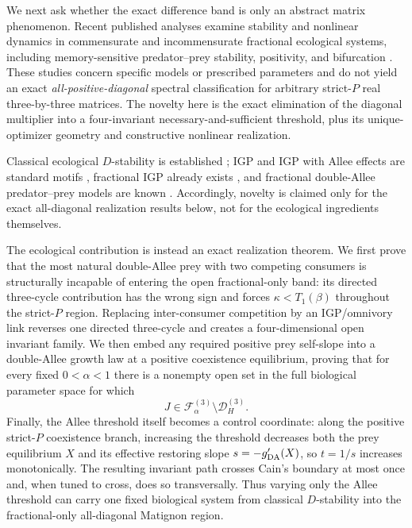 We next ask whether the exact difference band is only an abstract matrix phenomenon. Recent published analyses examine stability and nonlinear dynamics in commensurate and incommensurate fractional ecological systems, including memory-sensitive predator--prey stability, positivity, and bifurcation \cite{LiuLiHuang2025,AlomariBahaa2026,Baghel2026,Saha2026}. These studies concern specific models or prescribed parameters and do not yield an exact \emph{all-positive-diagonal} spectral classification for arbitrary strict-\(P\) real three-by-three matrices. The novelty here is the exact elimination of the diagonal multiplier into a four-invariant necessary-and-sufficient threshold, plus its unique-optimizer geometry and constructive nonlinear realization.

Classical ecological \(D\)-stability is established \cite{HouBaigent2015,ChenWangLiu2024}; IGP and IGP with Allee effects are standard motifs \cite{HoltPolis1997,BaiKangRuanWang2021}, fractional IGP already exists \cite{Panja2019}, and fractional double-Allee predator--prey models are known \cite{FractalFract2026DoubleAllee,Mondal2025}. Accordingly, novelty is claimed only for the exact all-diagonal realization results below, not for the ecological ingredients themselves.

The ecological contribution is instead an exact realization theorem. We first prove that the most natural double-Allee prey with two competing consumers is structurally incapable of entering the open fractional-only band: its directed three-cycle contribution has the wrong sign and forces \(\kappa<T_1(\beta)\) throughout the strict-\(P\) region. Replacing inter-consumer competition by an IGP/omnivory link reverses one directed three-cycle and creates a four-dimensional open invariant family. We then embed any required positive prey self-slope into a double-Allee growth law at a positive coexistence equilibrium, proving that for every fixed \(0<\alpha<1\) there is a nonempty open set in the full biological parameter space for which
\[
 J\in\mathcal F_\alpha^{(3)}
 \setminus
 \mathcal D_H^{(3)}.
\]
Finally, the Allee threshold itself becomes a control coordinate: along the positive strict-\(P\) coexistence branch, increasing the threshold decreases both the prey equilibrium \(X\) and its effective restoring slope \(s=-g'_{\rm DA}(X)\), so \(t=1/s\) increases monotonically. The resulting invariant path crosses Cain's boundary at most once and, when tuned to cross, does so transversally. Thus varying only the Allee threshold can carry one fixed biological system from classical \(D\)-stability into the fractional-only all-diagonal Matignon region.

